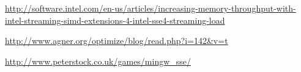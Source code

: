 \documentclass[a4paper,12pt]{scrartcl}
\begin{document}

\begin{thebibliography}{9}
        \url{http://software.intel.com/en-us/articles/increasing-memory-throughput-with-intel-streaming-simd-extensions-4-intel-sse4-streaming-load}

        \url{http://www.agner.org/optimize/blog/read.php?i=142&v=t}

        \url{http://www.peterstock.co.uk/games/mingw_sse/}
\end{thebibliography}
\end{document}
